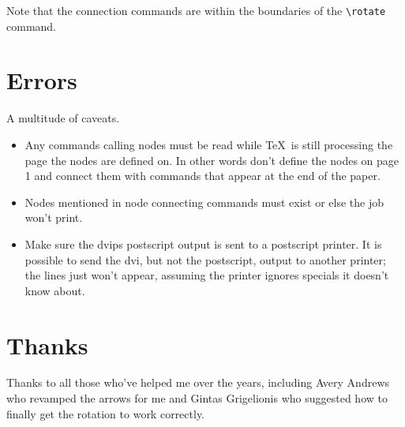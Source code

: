 Note that the connection commands are within the boundaries of the
\verb+\rotate+ command.

\section{Errors}

A multitude of caveats.
\begin{itemize}
  \item Any commands calling nodes must be read while \TeX\ is still
processing the page the nodes are defined on. In other words don't
define the nodes on page 1 and connect them with commands that appear
at the end of the paper.

\item Nodes mentioned in node connecting commands must exist or else
      the job won't print.  

\item Make sure the dvips postscript output is sent to a postscript
printer.  It is possible to send the dvi, but not the postscript,
output to another printer; the lines just won't appear, assuming the
printer ignores specials it doesn't know about.


\end{itemize}

\section{Thanks}

Thanks to all those who've helped me over the years, including Avery
Andrews who revamped the arrows for me and Gintas Grigelionis who
suggested how to finally get the rotation to work correctly.





